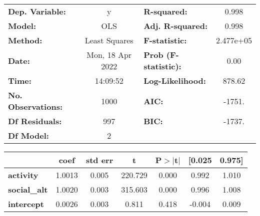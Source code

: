 \begin{center}
\begin{tabular}{lclc}
\toprule
\textbf{Dep. Variable:}    &        y         & \textbf{  R-squared:         } &     0.998   \\
\textbf{Model:}            &       OLS        & \textbf{  Adj. R-squared:    } &     0.998   \\
\textbf{Method:}           &  Least Squares   & \textbf{  F-statistic:       } & 2.477e+05   \\
\textbf{Date:}             & Mon, 18 Apr 2022 & \textbf{  Prob (F-statistic):} &     0.00    \\
\textbf{Time:}             &     14:09:52     & \textbf{  Log-Likelihood:    } &    878.62   \\
\textbf{No. Observations:} &        1000      & \textbf{  AIC:               } &    -1751.   \\
\textbf{Df Residuals:}     &         997      & \textbf{  BIC:               } &    -1737.   \\
\textbf{Df Model:}         &           2      & \textbf{                     } &             \\
\bottomrule
\end{tabular}
\begin{tabular}{lcccccc}
                     & \textbf{coef} & \textbf{std err} & \textbf{t} & \textbf{P$> |$t$|$} & \textbf{[0.025} & \textbf{0.975]}  \\
\midrule
\textbf{activity}    &       1.0013  &        0.005     &   220.729  &         0.000        &        0.992    &        1.010     \\
\textbf{social\_alt} &       1.0020  &        0.003     &   315.603  &         0.000        &        0.996    &        1.008     \\
\textbf{intercept}   &       0.0026  &        0.003     &     0.811  &         0.418        &       -0.004    &        0.009     \\
\bottomrule

\end{tabular}

\end{center}